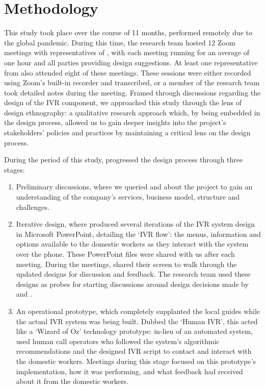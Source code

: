 \section{Methodology}

This study took place over the course of 11 months, performed remotely due to the global pandemic. During this time, the research team hosted 12 Zoom meetings with representatives of \PC{}, with each meeting running for an average of one hour and all parties providing design suggestions. At least one representative from \NGO{} also attended eight of these meetings. These sessions were either recorded using Zoom's built-in recorder and transcribed, or a member of the research team took detailed notes during the meeting. Framed through discussions regarding the design of the IVR component, we approached this study through the lens of design ethnography: a qualitative research approach which, by being embedded in the design process, allowed us to gain deeper insights into the project's stakeholders' policies and practices by maintaining a critical lens on the design process.

During the period of this study, \PC{} progressed the design process through three stages: 

\begin{enumerate}
\item Preliminary discussions, where we queried \PC{} and \NGO{} about the project to gain an understanding of the company's services, business model, structure and challenges.  

\item Iterative design, where \PC{} produced several iterations of the IVR system design in Microsoft PowerPoint, detailing the `IVR flow': the menus, information and options available to the domestic workers as they interact with the system over the phone. These PowerPoint files were shared with us after each meeting. During the meetings, \PC{} shared their screen to walk through the updated designs for discussion and feedback. The research team used these designs as probes for starting discussions around design decisions made by \PC{} and \NGO{}.

\item An operational prototype, which completely supplanted the local guides while the actual IVR system was being built. Dubbed the `Human IVR', this acted like a `Wizard of Oz' technology prototype: in-lieu of an automated system, \PC{} used human call operators who followed the system's algorithmic recommendations and the designed IVR script to contact and interact with the domestic workers. Meetings during this stage focused on this prototype's implementation, how it was performing, and what feedback \PC{} had received about it from the domestic workers.
\end{enumerate}

